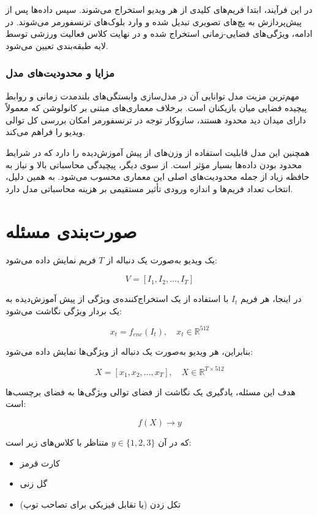 \documentclass[12pt]{report}
\begin{document}
در این فرآیند، ابتدا فریم‌های کلیدی از هر ویدیو استخراج می‌شوند. سپس داده‌ها پس از پیش‌پردازش به پچ‌های تصویری تبدیل شده و وارد بلوک‌های ترنسفورمر می‌شوند. در ادامه، ویژگی‌های فضایی-زمانی استخراج شده و در نهایت کلاس فعالیت ورزشی توسط لایه طبقه‌بندی تعیین می‌شود.

\subsubsection{مزایا و محدودیت‌های مدل}

مهم‌ترین مزیت مدل  توانایی آن در مدل‌سازی وابستگی‌های بلندمدت زمانی و روابط پیچیده فضایی میان بازیکنان است. برخلاف معماری‌های مبتنی بر کانولوشن که معمولاً دارای میدان دید محدود هستند، سازوکار توجه در ترنسفورمر امکان بررسی کل توالی ویدیو را فراهم می‌کند.

همچنین این مدل قابلیت استفاده از وزن‌های از پیش آموزش‌دیده را دارد که در شرایط محدود بودن داده‌ها بسیار مؤثر است. از سوی دیگر، پیچیدگی محاسباتی بالا و نیاز به حافظه زیاد از جمله محدودیت‌های اصلی این معماری محسوب می‌شود. به همین دلیل، انتخاب تعداد فریم‌ها و اندازه ورودی تأثیر مستقیمی بر هزینه محاسباتی مدل دارد.


\section{صورت‌بندی مسئله}
\label{sec:problem_formulation}

یک ویدیو به‌صورت یک دنباله از $T$ فریم نمایش داده می‌شود:

\[
V = [I_1, I_2, \dots, I_T]
\]

در اینجا، هر فریم $I_t$ با استفاده از یک استخراج‌کننده‌ی ویژگی از پیش آموزش‌دیده  به یک بردار ویژگی نگاشت می‌شود:

\[
x_t = f_{enc}(I_t), \quad x_t \in \mathbb{R}^{512}
\]

بنابراین، هر ویدیو به‌صورت یک دنباله از ویژگی‌ها نمایش داده می‌شود:

\[
X = [x_1, x_2, \dots, x_T], \quad X \in \mathbb{R}^{T \times 512}
\]

هدف این مسئله، یادگیری یک نگاشت  از فضای توالی ویژگی‌ها به فضای برچسب‌ها است:

\[
f(X) \rightarrow y
\]

که در آن $y \in \{1,2,3\}$ متناظر با کلاس‌های زیر است:

\begin{itemize}
    \item کارت قرمز 
    \item گل زنی
    \item تکل زدن (یا تقابل فیزیکی برای تصاحب توپ)
\end{itemize}
\end{document}
